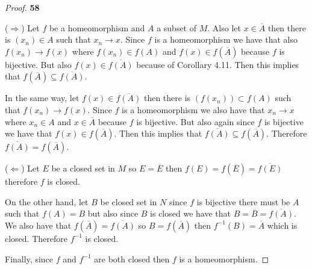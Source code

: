 \documentclass[11pt]{article}
\theoremstyle{definition}
\begin{document}
    \begin{proof}{\textbf{58}}

        ($\Rightarrow$) Let $f$ be a homeomorphism and $A$ a subset of $M$.
        Also let $x \in \overline{A}$ then there is $(x_n) \in A$ such that
        $x_n \to x$.
        Since $f$ is a homeomorphism we have that also $f(x_n) \to f(x)$ where
        $f(x_n) \in f(A)$ and $f(x) \in f(\overline{A})$ because $f$ is
        bijective. But also $f(x) \in \overline{f(A)}$ because of Corollary
        4.11. Then this implies that $f(\overline{A}) \subseteq \overline{f(A)}$.

        In the same way, let $f(x) \in \overline{f(A)}$ then there is
        $(f(x_n)) \subset f(A)$ such that $f(x_n) \to f(x)$.
        Since $f$ is a homeomorphism we also have that $x_n \to x$ where
        $x_n \in A$ and $x \in \overline{A}$ because $f$ is bijective. But also
        again since $f$ is bijective we have that
        $f(x) \in f(\overline{A})$. Then this implies that
        $\overline{f(A)} \subseteq f(\overline{A})$.
        Therefore $\overline{f(A)} = f(\overline{A})$.

        ($\Leftarrow$) Let $E$ be a closed set in $M$ so $E = \overline{E}$
        then $f(E) = f(\overline{E}) = \overline{f(E)}$ therefore $f$ is closed.

        On the other hand, let $B$ be closed set in $N$
        since $f$ is bijective there must be $A$ such that $f(A) = B$ but also
        since $B$ is closed we have that $B = \overline{B} = \overline{f(A)}$.
        We also have that $f(\overline{A}) = \overline{f(A)}$ so
        $B = f(\overline{A})$ then $f^{-1}(B) = \overline{A}$ which is closed.
        Therefore $f^{-1}$ is closed.

        Finally, since $f$ and $f^{-1}$ are both closed then $f$ is a
        homeomorphism.
    \end{proof}
\cleardoublepage
\end{document}
